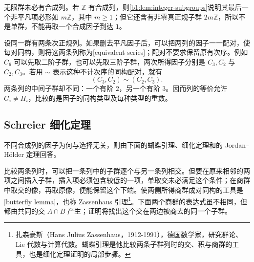 无限群未必有合成列。若 \(\mathbb Z\) 有合成列，则\cref{b1:lem:integer-subgroups}说明其最后一个非平凡项必形如 \(m\mathbb Z\)，其中 \(m\ge1\)；但它还含有非零真正规子群 \(2m\mathbb Z\)，所以不是单群，不能再取一个合成因子到达 \(1\)。

\ProseParagraphBreak
设同一群有两条次正规列。如果删去平凡因子后，可以把两列的因子一一配对，使每对同构，则将这两条列称为[equivalent series]；配对不要求保留原有次序。例如 \(C_6\) 可以先取二阶子群，也可以先取三阶子群，两次所得因子分别是 \(C_3,C_2\) 与 \(C_2,C_3\)。若用 \(\sim\) 表示这种不计次序的同构配对，就有
\[
	(C_3,C_2)\sim(C_2,C_3).
\]
两条列的中间子群却不同：一个有阶 \(2\)，另一个有阶 \(3\)。因而列的等价允许 \(G_i\ne H_i\)，比较的是因子的同构类型及每种类型的重数。

\subsection{Schreier 细化定理}
\label{b1:subsec:0701:02}

不同合成列的因子为何与选择无关，则由下面的蝴蝶引理、细化定理和的 Jordan--Hölder 定理回答。

\ProseParagraphBreak
比较两条列时，可以把一条列中的子群逐个与另一条列相交。但要在原来相邻的两项之间插入子群，插入项必须包含较低的一项，单取交未必满足这个条件；在商群中取交的像，再取原像，便能保留这个下端。使两侧所得商群成对同构的工具是[butterfly lemma]，也称 Zassenhaus 引理\footnote{扎森豪斯（Hans Julius Zassenhaus，1912-1991），德国数学家，研究群论、Lie 代数与计算代数。蝴蝶引理是他比较两条子群列时的交、积与商群的工具，也是细化定理证明的局部步骤。}。下面两个商群的表达式虽不相同，但都由共同的交 \(A\cap B\) 产生；证明将找出这个交在两边被商去的同一个子群。

